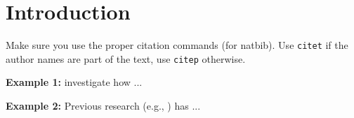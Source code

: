 \section{Introduction}
\label{sec:icse19:introduction}

Make sure you use the proper citation commands (for natbib). 
Use \texttt{citet} if the author names are part of the text, use \texttt{citep} otherwise.

\noindent \textbf{Example 1:} 
\citet{schermann:18:2} investigate how ...

\noindent \textbf{Example 2:} 
Previous research (e.g., \citep{schermann:18:2}) has ...